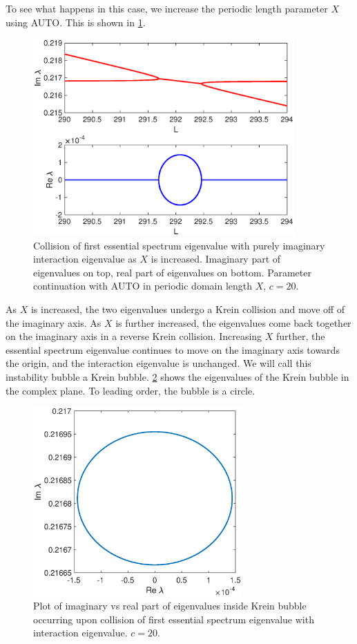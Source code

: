 \documentclass[11pt,reqno]{amsart}
\theoremstyle{plain}
\theoremstyle{definition}
\theoremstyle{remark}
\begin{document}
To see what happens in this case, we increase the periodic length parameter $X$ using AUTO. This is shown in \cref{fig:kreinbubble1}.
\begin{figure}
\begin{center}
\includegraphics[width=10cm]{images/kreinbubble1}
\end{center}
\caption[Eigenvalue collisions for periodic double pulses in KdV5]{Collision of first essential spectrum eigenvalue with purely imaginary interaction eigenvalue as $X$ is increased. Imaginary part of eigenvalues on top, real part of eigenvalues on bottom. Parameter continuation with AUTO in periodic domain length $X$, $c = 20$.}
\label{fig:kreinbubble1}
\end{figure}
As $X$ is increased, the two eigenvalues undergo a Krein collision and move off of the imaginary axis. As $X$ is further increased, the eigenvalues come back together on the imaginary axis in a reverse Krein collision. Increasing $X$ further, the essential spectrum eigenvalue continues to move on the imaginary axis towards the origin, and the interaction eigenvalue is unchanged. We will call this instability bubble a Krein bubble. \cref{fig:kreinbubble1zoom} shows the eigenvalues of the Krein bubble in the complex plane. To leading order, the bubble is a circle.
\begin{figure}
\begin{center}
\includegraphics[width=8cm]{images/kreinbubble1zoom}
\end{center}
\caption[First Krein bubble for KdV5]{Plot of imaginary vs real part of eigenvalues inside Krein bubble occurring upon collision of first essential spectrum eigenvalue with interaction eigenvalue. $c = 20$.}
\label{fig:kreinbubble1zoom}
\end{figure}
\end{document}
